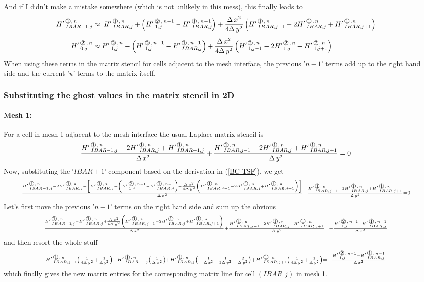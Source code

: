 And if I didn't make a mistake somewhere (which is not unlikely in this mess), this finally leads to
\begin{align}
\label{BC-TSF}
\HL{IBAR+1,j}{1}{n} & \approx \;  \HL{IBAR,j}{1}{n}  + \left(\HL{1,j}{2}{n-1} - \HL{IBAR,j}{1}{n-1}\right) 
                                                + \frac{\DXT}{4\DYT}   \left(\HL{IBAR,j-1}{1}{n} - 2 \HL{IBAR,j}{1}{n} + \HL{IBAR,j+1}{1}{n} \right) \\[1ex]
\HL{0,j}{2}{n} & \approx  \HL{1,j}{2}{n}  - \left( \HL{1,j}{2}{n-1} - \HL{IBAR,j}{1}{n-1}\right)
                                                + \frac{\DXT}{4\DYT}   \left(\HL{1,j-1}{2}{n} - 2 \HL{1,j}{2}{n} + \HL{1,j+1}{2}{n}\right)      \nonumber                                           
\end{align}
When using these terms in the matrix stencil for cells adjacent to the mesh interface, the previous '${n-1}$' terms add up to the right hand side and the current '$n$' terms to the matrix itself.

\subsubsection{Substituting the ghost values in the matrix stencil in 2D}
%
\paragraph{Mesh 1:} 
For a cell in mesh 1 adjacent to the mesh interface the usual Laplace matrix stencil is
\[   \frac{ \HL{IBAR-1,j}{1}{n} -2 \HL{IBAR,j}{1}{n} + \HL{IBAR+1,j}{1}{n} }{\DXT} +  
    \frac{ \HL{IBAR,j-1}{1}{n} -2 \HL{IBAR,j}{1}{n} + \HL{IBAR,j+1}{1}{n} }{\DYT} = 0 \]
Now, substituting the '$IBAR+1$' component based on the derivation in (\ref{BC-TSF}), we get 
\[ {\scriptstyle  \frac{ \HL{IBAR-1,j}{1}{n} -2 \HL{IBAR,j}{1}{n} 
+ \left[ \HL{IBAR,j}{1}{n}  + \left(\HL{1,j}{2}{n-1} - \HL{IBAR,j}{1}{n-1}\right) + \frac{\DXT}{4\DYT}   \left(\HL{IBAR,j-1}{1}{n} - 2 \HL{IBAR,j}{1}{n} + \HL{IBAR,j+1}{1}{n} \right) \right]}{\DXT}
+      \frac{ \HL{IBAR,j-1}{1}{n} -2 \HL{IBAR,j}{1}{n} + \HL{IBAR,j+1}{1}{n} }{\DYT} = 0}
\]
Let's first move the previous '${n-1}$' terms on the right hand side and sum up the obvious
\[ {\scriptstyle  \frac{ \HL{IBAR-1,j}{1}{n} - \HL{IBAR,j}{1}{n}   
+ \frac{\DXT}{4\DYT}   \left(\HL{IBAR,j-1}{1}{n} - 2 \HL{IBAR,j}{1}{n} + \HL{IBAR,j+1}{1}{n} \right) }{\DXT}
+      \frac{ \HL{IBAR,j-1}{1}{n} -2 \HL{IBAR,j}{1}{n} + \HL{IBAR,j+1}{1}{n} }{\DYT} = -\frac{\HL{1,j}{2}{n-1} - \HL{IBAR,j}{1}{n-1}}{\DXT} }
\]
and then resort the whole stuff
\[ {\scriptstyle 
      \HL{IBAR,j-1}{1}{n} \left( \frac {1}{4\DYT} + \frac {1}{\DYT}    \right)
 +   \HL{IBAR-1,j}{1}{n} \left( \frac {1}{\DXT} \right)
 +   \HL{IBAR,j}{1}{n} \left( -\frac {1}{\DXT} - \frac {1}{2\DYT} - \frac {2}{\DYT}    \right)
 +   \HL{IBAR,j+1}{1}{n} \left( \frac {1}{4\DYT}   + \frac {1}{\DYT}    \right)
    = -\frac{\HL{1,j}{2}{n-1} - \HL{IBAR,j}{1}{n-1}}{\DXT} }
\]
which finally gives the new matrix entries for the corresponding matrix line for cell $(IBAR,j)$ in mesh 1. 

